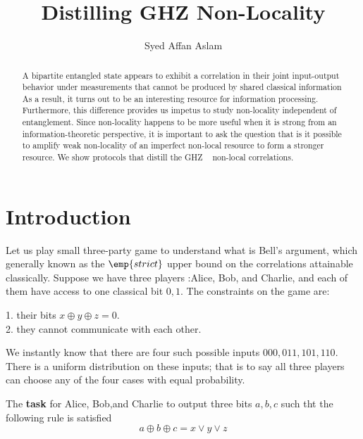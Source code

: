 \documentclass[aps,prl,twocolumn,groupedaddress]{revtex4}
\begin{document}
\title{Distilling GHZ Non-Locality}

\author{Syed Affan Aslam} 

\begin{abstract}
    
    A bipartite entangled state appears to exhibit a correlation in their joint input-output behavior under measurements that cannot be produced by shared classical information As a result, it turns out to be an interesting resource for information processing. Furthermore, this difference provides us impetus to study non-locality independent of entanglement. Since non-locality happens to be more useful when it is strong from an information-theoretic perspective, it is important to ask the question that is it possible to amplify weak non-locality of an imperfect non-local resource to form a stronger resource. We show protocols that distill the GHZ ~\cite{ghz-1990} non-local correlations. 
    
\end{abstract}




\maketitle

\section{Introduction}

Let us play small three-party game to understand what is Bell's argument, which generally known as the $\emp{strict}$ upper bound on the correlations attainable classically. Suppose we have three players :Alice, Bob, and Charlie, and each of them have access to one classical bit ${0,1}$. The constraints on the game are:
\begin{enumerate}
  1. their bits $x \oplus y \oplus z = 0$.\\
  2. they cannot communicate with each other.\\
\end{enumerate}

We instantly know that there are four such possible inputs $000,011,101,110$. There is a uniform distribution on these inputs; that is to say all three players can choose any of the four cases with equal probability. 

The \textbf{task} for Alice, Bob,and Charlie to output three bits $a,b,c$ such tht the following rule is satisfied 
\[a \oplus b \oplus c = x \vee y \vee z \]
\end{document}
